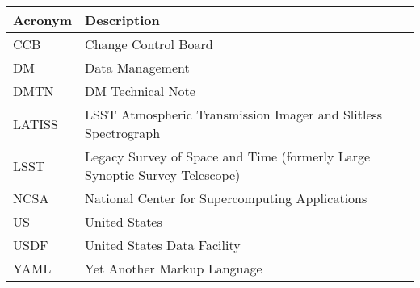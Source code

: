 \addtocounter{table}{-1}
\begin{longtable}{p{}p{}}\hline
\textbf{Acronym} & \textbf{Description}  \\\hline

CCB & Change Control Board \\\hline
DM & Data Management \\\hline
DMTN & DM Technical Note \\\hline
LATISS & LSST Atmospheric Transmission Imager and Slitless Spectrograph \\\hline
LSST & Legacy Survey of Space and Time (formerly Large Synoptic Survey Telescope) \\\hline
NCSA & National Center for Supercomputing Applications \\\hline
US & United States \\\hline
USDF & United States Data Facility \\\hline
YAML & Yet Another Markup Language \\\hline
\end{longtable}
